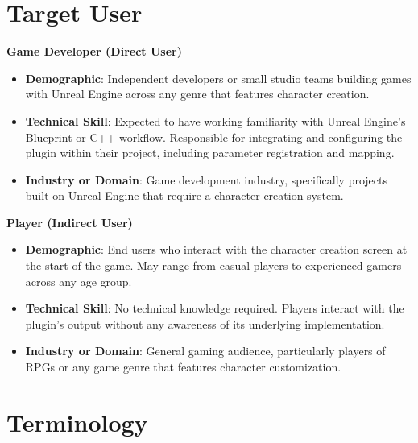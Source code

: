 \newpage
\section{Target User}
\label{section:target-user}

\textbf{Game Developer (Direct User)}
\begin{itemize}
    \item \textbf{Demographic}: Independent developers or small 
    studio teams building games with Unreal Engine across any genre 
    that features character creation.
    
    \item \textbf{Technical Skill}: Expected to have working 
    familiarity with Unreal Engine's Blueprint or C++ workflow. 
    Responsible for integrating and configuring the plugin within 
    their project, including parameter registration and mapping.
    
    \item \textbf{Industry or Domain}: Game development industry, 
    specifically projects built on Unreal Engine that require a 
    character creation system.
\end{itemize}

\textbf{Player (Indirect User)}
\begin{itemize}
    \item \textbf{Demographic}: End users who interact with the 
    character creation screen at the start of the game. May range 
    from casual players to experienced gamers across any age group.
    
    \item \textbf{Technical Skill}: No technical knowledge required. 
    Players interact with the plugin's output without any awareness 
    of its underlying implementation.
    
    \item \textbf{Industry or Domain}: General gaming audience, 
    particularly players of RPGs or any game genre that features 
    character customization.
\end{itemize}

\section{Terminology}
\label{section:terminology}

